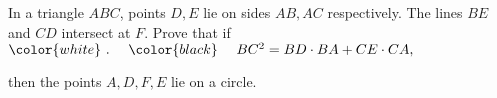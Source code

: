 In a triangle $ABC$,  points $D,E$ lie on sides $AB,AC$ respectively. The lines $BE$ and $CD$ intersect at $F$. Prove that if$\color{white}\ .\quad\ \color{black}\ \quad BC^2=BD\cdot BA+CE\cdot CA,$

then the points $A,D,F,E$ lie on a circle.